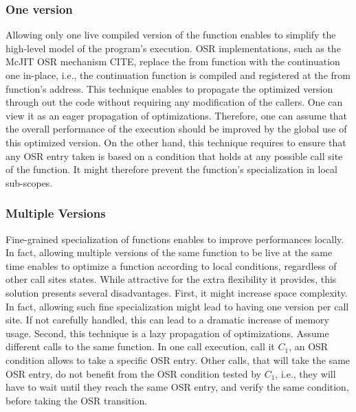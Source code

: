 \subsubsection{One version}
Allowing only one live compiled version of the function enables to simplify the high-level model of the program's execution.
OSR implementations, such as the McJIT OSR mechanism CITE, replace the from function with the continuation one in-place, i.e., the continuation function is compiled and registered at the from function's address.
This technique enables to propagate the optimized version through out the code without requiring any modification of the callers.
One can view it as an eager propagation of optimizations.
Therefore, one can assume that the overall performance of the execution should be improved by the global use of this optimized version.
On the other hand, this technique requires to ensure that any OSR entry taken is based on a condition that holds at any possible call site of the function.
It might therefore prevent the function's specialization in local sub-scopes.\\ %

\subsubsection{Multiple Versions}
Fine-grained specialization of functions enables to improve performances locally.
In fact, allowing multiple versions of the same function to be live at the same time enables to optimize a function according to local conditions, regardless of other call sites states.
While attractive for the extra flexibility it provides, this solution presents several disadvantages.
First, it might increase space complexity.
In fact, allowing such fine specialization might lead to having one version per call site.
If not carefully handled, this can lead to a dramatic increase of memory usage.
Second, this technique is a lazy propagation of optimizations.
Assume different calls to the same function.
In one call execution, call it $C_1$, an OSR condition allows to take a specific OSR entry.
Other calls, that will take the same OSR entry, do not benefit from the OSR condition tested by $C_1$, i.e., they will have to wait until they reach the same OSR entry, and verify the same condition, before taking the OSR transition.



